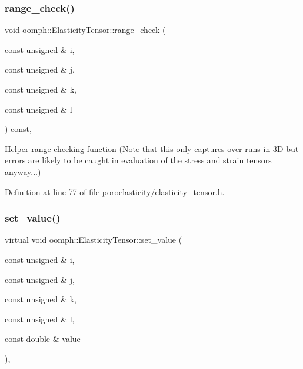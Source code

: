 \subsubsection{\texorpdfstring{range\+\_\+check()}{range\_check()}\hspace{0.1cm}{\footnotesize\ttfamily [2/2]}}
{\footnotesize\ttfamily void oomph\+::\+Elasticity\+Tensor\+::range\+\_\+check (\begin{DoxyParamCaption}\item[{const unsigned \&}]{i,  }\item[{const unsigned \&}]{j,  }\item[{const unsigned \&}]{k,  }\item[{const unsigned \&}]{l }\end{DoxyParamCaption}) const\hspace{0.3cm}{\ttfamily [inline]}, {\ttfamily [protected]}}



Helper range checking function (Note that this only captures over-\/runs in 3D but errors are likely to be caught in evaluation of the stress and strain tensors anyway...) 



Definition at line 77 of file poroelasticity/elasticity\+\_\+tensor.\+h.

\mbox{\label{classoomph_1_1ElasticityTensor_ab68e4386f02f9e39095d879e4ec96df5}} 
\subsubsection{\texorpdfstring{set\+\_\+value()}{set\_value()}}
{\footnotesize\ttfamily virtual void oomph\+::\+Elasticity\+Tensor\+::set\+\_\+value (\begin{DoxyParamCaption}\item[{const unsigned \&}]{i,  }\item[{const unsigned \&}]{j,  }\item[{const unsigned \&}]{k,  }\item[{const unsigned \&}]{l,  }\item[{const double \&}]{value }\end{DoxyParamCaption})\hspace{0.3cm}{\ttfamily [inline]}, {\ttfamily [virtual]}}



